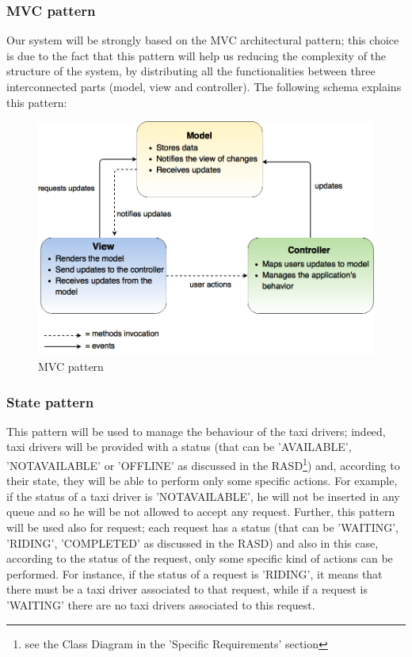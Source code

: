 \subsubsection{MVC pattern}

    Our system will be strongly based on the MVC architectural pattern; this choice is due to the fact that this pattern will help us reducing the complexity of the structure of the system, by distributing all the functionalities between three interconnected parts (model, view and controller).
    \newline
    \newline
    The following schema explains this pattern:
    \begin{figure}[H]
            \centering
            \includegraphics[width=14cm]{./Images/MVC.png}
            \caption{MVC pattern}
    \end{figure}

\subsubsection{State pattern}

    This pattern will be used to manage the behaviour of the taxi drivers; indeed, taxi drivers will be provided with a status (that can be 'AVAILABLE', 'NOTAVAILABLE' or 'OFFLINE' as discussed in the RASD\footnote{\label{note1}see the Class Diagram in the 'Specific Requirements' section}) and, according to their state, they will be able to perform only some specific actions.
    For example, if the status of a taxi driver is 'NOTAVAILABLE', he will not be inserted in any queue and so he will be not allowed to accept any request.
    \newline
    Further, this pattern will be used also for request; each request has a status (that can be 'WAITING', 'RIDING', 'COMPLETED' as discussed in the RASD\footnotemark[\ref{note1}]) and also in this case, according to the status of the request, only some specific kind of actions can be performed. For instance, if the status of a request is 'RIDING', it means that there must be a taxi driver associated to that request, while if a request is 'WAITING' there are no taxi drivers associated to this request.
    
